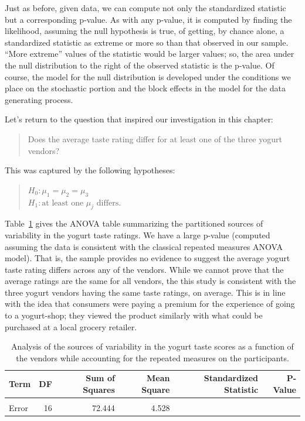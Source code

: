 \documentclass[
  letterpaper,
  DIV=11,
  numbers=noendperiod]{scrreprt}
\theoremstyle{plain}
\theoremstyle{definition}
\theoremstyle{definition}
\theoremstyle{remark}
\begin{document}
Just as before, given data, we can compute not only the standardized
statistic but a corresponding p-value. As with any p-value, it is
computed by finding the likelihood, assuming the null hypothesis is
true, of getting, by chance alone, a standardized statistic as extreme
or more so than that observed in our sample. ``More extreme'' values of
the statistic would be larger values; so, the area under the null
distribution to the right of the observed statistic is the p-value. Of
course, the model for the null distribution is developed under the
conditions we place on the stochastic portion and the block effects in
the model for the data generating process.

Let's return to the question that inspired our investigation in this
chapter:

\begin{quote}
Does the average taste rating differ for at least one of the three
yogurt vendors?
\end{quote}

This was captured by the following hypotheses:

\begin{quote}
\(H_0: \mu_1 = \mu_2 = \mu_3\)\\
\(H_1: \text{at least one } \mu_j \text{ differs}.\)
\end{quote}

Table~\ref{tbl-blockteststat-anova} gives the ANOVA table summarizing
the partitioned sources of variability in the yogurt taste ratings. We
have a large p-value (computed assuming the data is consistent with the
classical repeated measures ANOVA model). That is, the sample provides
no evidence to suggest the average yogurt taste rating differs across
any of the vendors. While we cannot prove that the average ratings are
the same for all vendors, the this study is consistent with the three
yogurt vendors having the same taste ratings, on average. This is in
line with the idea that consumers were paying a premium for the
experience of going to a yogurt-shop; they viewed the product similarly
with what could be purchased at a local grocery retailer.

\hypertarget{tbl-blockteststat-anova}{}
\begin{table}
\caption{\label{tbl-blockteststat-anova}Analysis of the sources of variability in the yogurt taste scores as a
function of the vendors while accounting for the repeated measures on
the participants. }\tabularnewline

\centering
\begin{tabular}[t]{lrrrrr}
\toprule
Term & DF & Sum of Squares & Mean Square & Standardized Statistic & P-Value\\
\midrule
\cellcolor{gray!6}{Vendor} & \cellcolor{gray!6}{2} & \cellcolor{gray!6}{2.889} & \cellcolor{gray!6}{1.444} & \cellcolor{gray!6}{0.319} & \cellcolor{gray!6}{0.731}\\
Error & 16 & 72.444 & 4.528 &  & \\
\bottomrule
\end{tabular}
\end{table}
\end{document}
